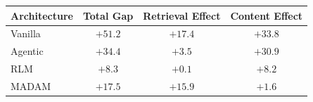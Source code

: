 \begin{tabular}{@{}lccc@{}}
\toprule
\textbf{Architecture} & \textbf{Total Gap} & \textbf{Retrieval Effect} & \textbf{Content Effect} \\
\midrule
Vanilla & $+51.2$ & $+17.4$ & $+33.8$ \\
Agentic & $+34.4$ & $+3.5$ & $+30.9$ \\
RLM & $+8.3$ & $+0.1$ & $+8.2$ \\
MADAM & $+17.5$ & $+15.9$ & $+1.6$ \\
\bottomrule
\end{tabular}